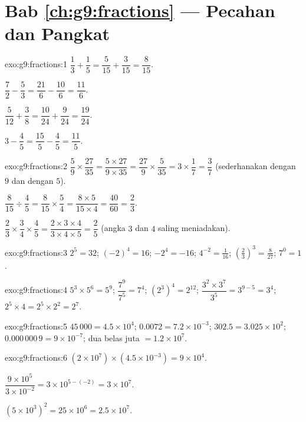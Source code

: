 \section*{Bab \ref{ch:g9:fractions} --- Pecahan dan Pangkat}

\begin{solution}{exo:g9:fractions:1}
$\dfrac13 + \dfrac15 = \dfrac{5}{15} + \dfrac{3}{15} = \dfrac{8}{15}$.

$\dfrac72 - \dfrac53 = \dfrac{21}{6} - \dfrac{10}{6} = \dfrac{11}{6}$.

$\dfrac{5}{12} + \dfrac38 = \dfrac{10}{24} + \dfrac{9}{24} =
\dfrac{19}{24}$.

$3 - \dfrac45 = \dfrac{15}{5} - \dfrac45 = \dfrac{11}{5}$.
\end{solution}

\begin{solution}{exo:g9:fractions:2}
$\dfrac59 \times \dfrac{27}{35} = \dfrac{5 \times 27}{9 \times 35}
= \dfrac{27}{9} \times \dfrac{5}{35} = 3 \times \dfrac17 = \dfrac37$
(sederhanakan dengan $9$ dan dengan $5$).

$\dfrac{8}{15} \div \dfrac45 = \dfrac{8}{15} \times \dfrac54
= \dfrac{8 \times 5}{15 \times 4} = \dfrac{40}{60} = \dfrac23$.

$\dfrac23 \times \dfrac34 \times \dfrac45 = \dfrac{2 \times 3 \times 4}
{3 \times 4 \times 5} = \dfrac25$ (angka $3$ dan $4$ saling meniadakan).
\end{solution}

\begin{solution}{exo:g9:fractions:3}
$2^5 = 32$; \quad $(-2)^4 = 16$; \quad $-2^4 = -16$; \quad
$4^{-2} = \frac{1}{16}$; \quad
$\left(\frac23\right)^3 = \frac{8}{27}$; \quad $7^0 = 1$.
\end{solution}

\begin{solution}{exo:g9:fractions:4}
$5^3 \times 5^6 = 5^9$; \quad $\dfrac{7^9}{7^5} = 7^4$; \quad
$\left(2^3\right)^4 = 2^{12}$; \quad
$\dfrac{3^2 \times 3^7}{3^5} = 3^{9-5} = 3^4$; \quad
$2^5 \times 4 = 2^5 \times 2^2 = 2^7$.
\end{solution}

\begin{solution}{exo:g9:fractions:5}
$45\,000 = 4.5 \times 10^4$; \quad
$0.0072 = 7.2 \times 10^{-3}$; \quad
$302.5 = 3.025 \times 10^2$; \quad
$0.000\,000\,9 = 9 \times 10^{-7}$; \quad
dua belas juta $= 1.2 \times 10^7$.
\end{solution}

\begin{solution}{exo:g9:fractions:6}
$(2 \times 10^7) \times (4.5 \times 10^{-3}) = 9 \times 10^{4}$.

$\dfrac{9 \times 10^5}{3 \times 10^{-2}} = 3 \times 10^{5 - (-2)}
= 3 \times 10^7$.

$(5 \times 10^3)^2 = 25 \times 10^6 = 2.5 \times 10^7$.
\end{solution}

